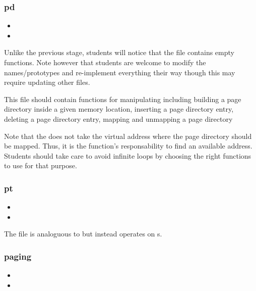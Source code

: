 \subsubsection*{pd}

\begin{itemize}
  \item
  \item
\end{itemize}

Unlike the previous stage, students will notice that the  file
contains empty functions. Note however that students are welcome to modify
the names/prototypes and re-implement everything their way though this may
require updating other files.

This file should contain functions for manipulating  including building a page directory inside a given memory
location, inserting a page directory entry, deleting a page directory
entry, mapping and unmapping a page directory \etc{}

Note that the  does not take the virtual address
where the page directory should be mapped. Thus, it is the function's
responsability to find an available address. Students should take care
to avoid infinite loops by choosing the right functions to use for that
purpose.

\subsubsection*{pt}

\begin{itemize}
  \item
  \item
\end{itemize}

The file  is analoguous to  but instead operates
on s.

\subsubsection*{paging}

\begin{itemize}
  \item
  \item
\end{itemize}

